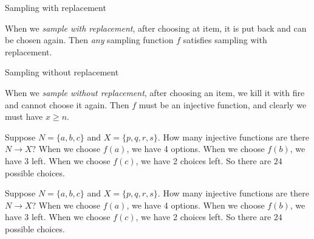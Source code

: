 %
\begin{note}
  \begin{field}
    Sampling with replacement
  \end{field}
  \begin{field}
    \begin{defi}
      When we \emph{sample with replacement}, after choosing at item, it is put back and can be chosen again. Then \emph{any} sampling function $f$ satisfies sampling with replacement.
    \end{defi}
  \end{field}
  \xplain{}%
\end{note}

%
\begin{note}
  \begin{field}
    Sampling without replacement
  \end{field}
  \begin{field}
    \begin{defi}
      When we \emph{sample without replacement}, after choosing an item, we kill it with fire and cannot choose it again. Then $f$ must be an injective function, and clearly we must have $x \geq n$.
    \end{defi}
  \end{field}
  \xplain{}%
\end{note}

\begin{note}
  \begin{field}
    \begin{eg}
      Suppose $N = \{a, b, c\}$ and $X = \{p, q, r, s\}$. How many injective functions are there $N\to X$?
      When we choose $f(a)$, we have 4 options. When we choose $f(b)$, we have 3 left. When we choose $f(c)$, we have 2 choices left. So there are $24$ possible choices.
    \end{eg}
  \end{field}
  \begin{field}
    \begin{eg}
      Suppose $N = \{a, b, c\}$ and $X = \{p, q, r, s\}$. How many injective functions are there $N\to X$?
      When we choose $f(a)$, we have 4 options. When we choose $f(b)$, we have 3 left. When we choose $f(c)$, we have 2 choices left. So there are $24$ possible choices.
    \end{eg}
  \end{field}
  \xplain{}%
\end{note}

